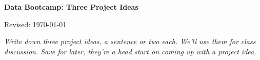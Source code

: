 


\pagestyle{headandfoot}
\runningheadrule
\firstpageheadrule
{}
\runningheader{}{}{}
\runningfooter{}{}{}


\bigskip
\centerline{\Large \bf Data Bootcamp: Three Project Ideas}
\medskip
\centerline{Revised: \today}

\bigskip
{\it Write down three project ideas, a sentence or two each. We'll use them for class discussion. 
Save for later, they're a head start on coming up with a project idea.}


%




